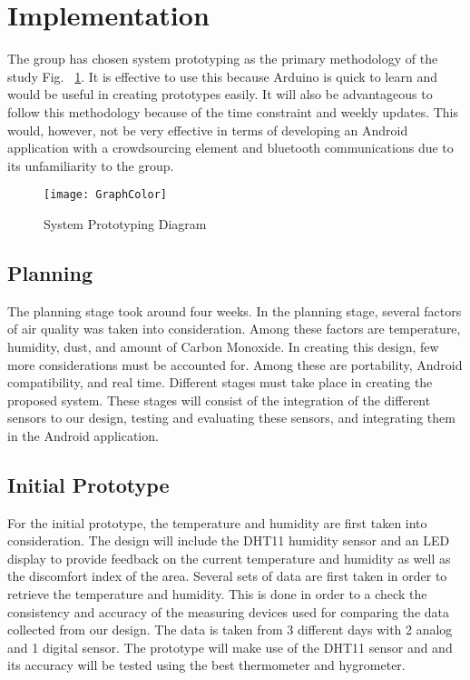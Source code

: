 \section{Implementation}
The group has chosen system prototyping as the primary methodology of the study Fig. ~\ref{fig:SPD}. It is effective to use this because Arduino is quick to learn and would be useful in creating prototypes easily. It will also be advantageous to follow this methodology because of the time constraint and weekly updates. This would, however, not be very effective in terms of developing an Android application with a crowdsourcing element and bluetooth communications due to its unfamiliarity to the group. 

\begin{figure}[h]
	\centering
	\texttt{[image: GraphColor]}
	\caption{System Prototyping Diagram}
	\label{fig:SPD}
\end{figure}

\subsection{Planning}
The planning stage took around four weeks. In the planning stage, several factors of air quality was taken into consideration. Among these factors are temperature, humidity, dust, and amount of Carbon Monoxide. In creating this design, few more considerations must be accounted for. Among these are portability, Android compatibility, and real time. Different stages must take place in creating the proposed system. These stages will consist of the integration of the different sensors to our design, testing and evaluating these sensors, and integrating them in the Android application. 

\subsection{Initial Prototype}
For the initial prototype, the temperature and humidity are first taken into consideration. The design will include the DHT11 humidity sensor and an LED display to provide feedback on the current temperature and humidity as well as the discomfort index of the area. Several sets of data are first taken in order to retrieve the temperature and humidity. This is done in order to a check the consistency and accuracy of the measuring devices used for comparing the data collected from our design. The data is taken from 3 different days with 2 analog and 1 digital sensor. The prototype will make use of the DHT11 sensor and and its accuracy will be tested using the best thermometer and hygrometer.

